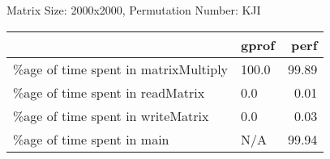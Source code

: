 \documentclass{article}
\begin{document}
    Matrix Size: 2000x2000, Permutation Number: KJI \\
    \begin{tabular}{llr}
\hline
                                      & gprof   &   perf \\
\hline
 \%age of time spent in matrixMultiply & 100.0   &  99.89 \\
 \%age of time spent in readMatrix     & 0.0     &   0.01 \\
 \%age of time spent in writeMatrix    & 0.0     &   0.03 \\
 \%age of time spent in main           & N/A     &  99.94 \\
\hline
\end{tabular}
    
\end{document}
